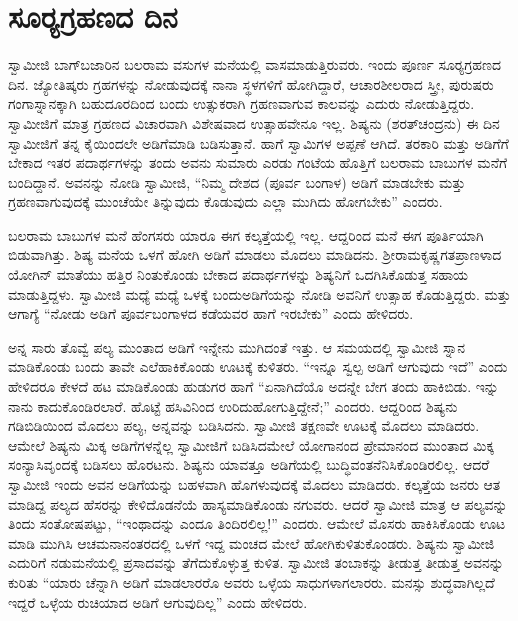 
\chapter{ಸೂರ‍್ಯಗ್ರಹಣದ ದಿನ}

ಸ್ವಾಮೀಜಿ ಬಾಗ್‍ಬಜಾರಿನ ಬಲರಾಮ ವಸುಗಳ ಮನೆಯಲ್ಲಿ ವಾಸಮಾಡುತ್ತಿರುವರು. ಇಂದು ಪೂರ್ಣ ಸೂರ‍್ಯಗ್ರಹಣದ ದಿನ. ಜ್ಯೋತಿಷ್ಕರು ಗ್ರಹಗಳನ್ನು ನೋಡುವುದಕ್ಕೆ ನಾನಾ ಸ್ಥಳಗಳಿಗೆ ಹೋಗಿದ್ದಾರೆ, ಆಚಾರಶೀಲರಾದ ಸ್ತ್ರೀ, ಪುರುಷರು ಗಂಗಾಸ್ನಾನಕ್ಕಾಗಿ ಬಹುದೂರದಿಂದ ಬಂದು ಉತ್ಸುಕರಾಗಿ ಗ್ರಹಣವಾಗುವ ಕಾಲವನ್ನು ಎದುರು ನೋಡುತ್ತಿದ್ದರು. ಸ್ವಾಮೀಜಿಗೆ ಮಾತ್ರ ಗ್ರಹಣದ ವಿಚಾರವಾಗಿ ವಿಶೇಷವಾದ ಉತ್ಸಾಹವೇನೂ ಇಲ್ಲ. ಶಿಷ್ಯನು (ಶರತ್‍ಚಂದ್ರನು) ಈ ದಿನ ಸ್ವಾಮೀಜಿಗೆ ತನ್ನ ಕೈಯಿಂದಲೇ ಅಡಿಗೆಮಾಡಿ ಬಡಿಸುತ್ತಾನೆ. ಹಾಗೆ ಸ್ವಾಮಿಗಳ ಅಪ್ಪಣೆ ಆಗಿದೆ. ತರಕಾರಿ ಮತ್ತು ಅಡಿಗೆಗೆ ಬೇಕಾದ ಇತರ ಪದಾರ್ಥಗಳನ್ನು ತಂದು ಅವನು ಸುಮಾರು ಎರಡು ಗಂಟೆಯ ಹೊತ್ತಿಗೆ ಬಲರಾಮ ಬಾಬುಗಳ ಮನೆಗೆ ಬಂದಿದ್ದಾನೆ. ಅವನನ್ನು ನೋಡಿ ಸ್ವಾಮೀಜಿ, “ನಿಮ್ಮ ದೇಶದ (ಪೂರ್ವ ಬಂಗಾಳ) ಅಡಿಗೆ ಮಾಡಬೇಕು ಮತ್ತು ಗ್ರಹಣವಾಗುವುದಕ್ಕೆ ಮುಂಚೆಯೇ ತಿನ್ನುವುದು ಕೊಡುವುದು ಎಲ್ಲಾ ಮುಗಿದು ಹೋಗಬೇಕು” ಎಂದರು. 

 ಬಲರಾಮ ಬಾಬುಗಳ ಮನೆ ಹೆಂಗಸರು ಯಾರೂ ಈಗ ಕಲ್ಕತ್ತೆಯಲ್ಲಿ ಇಲ್ಲ. ಆದ್ದರಿಂದ ಮನೆ ಈಗ ಪೂರ್ತಿಯಾಗಿ ಬಿಡುವಾಗಿತ್ತು. ಶಿಷ್ಯ ಮನೆಯ ಒಳಗೆ ಹೋಗಿ ಅಡಿಗೆ ಮಾಡಲು ಮೊದಲು ಮಾಡಿದನು. ಶ‍್ರೀರಾಮಕೃಷ್ಣಗತಪ್ರಾಣಳಾದ ಯೋಗಿನ್ ಮಾತೆಯು ಹತ್ತಿರ ನಿಂತುಕೊಂಡು ಬೇಕಾದ ಪದಾರ್ಥಗಳನ್ನು ಶಿಷ್ಯನಿಗೆ ಒದಗಿಸಿಕೊಡುತ್ತ ಸಹಾಯ ಮಾಡುತ್ತಿದ್ದಳು. ಸ್ವಾಮೀಜಿ ಮಧ್ಯೆ ಮಧ್ಯೆ ಒಳಕ್ಕೆ ಬಂದು\break ಅಡಿಗೆಯನ್ನು ನೋಡಿ ಅವನಿಗೆ ಉತ್ಸಾಹ ಕೊಡುತ್ತಿದ್ದರು. ಮತ್ತು ಆಗಾಗ್ಯೆ “ನೋಡು ಅಡಿಗೆ ಪೂರ್ವಬಂಗಾಳದ ಕಡೆಯವರ ಹಾಗೆ ಇರಬೇಕು” ಎಂದು ಹೇಳಿದರು. 

 ಅನ್ನ ಸಾರು ತೊವ್ವೆ ಪಲ್ಯ ಮುಂತಾದ ಅಡಿಗೆ ಇನ್ನೇನು ಮುಗಿದಂತೆ ಇತ್ತು. ಆ ಸಮಯದಲ್ಲಿ ಸ್ವಾಮೀಜಿ ಸ್ನಾನ ಮಾಡಿಕೊಂಡು ಬಂದು ತಾವೇ ಎಲೆಹಾಕಿಕೊಂಡು ಊಟಕ್ಕೆ ಕುಳಿತರು. “ಇನ್ನೂ ಸ್ವಲ್ಪ ಅಡಿಗೆ ಆಗುವುದು ಇದೆ” ಎಂದು ಹೇಳಿದರೂ ಕೇಳದೆ ಹಟ ಮಾಡಿಕೊಂಡು ಹುಡುಗರ ಹಾಗೆ “ಏನಾಗಿದೆಯೊ ಅದನ್ನೇ ಬೇಗ ತಂದು ಹಾಕಿಬಿಡು. ಇನ್ನು ನಾನು ಕಾದುಕೊಂಡಿರಲಾರೆ. ಹೊಟ್ಟೆ ಹಸಿವಿನಿಂದ ಉರಿದುಹೋಗುತ್ತಿದ್ದೇನೆ;” ಎಂದರು. ಆದ್ದರಿಂದ ಶಿಷ್ಯನು ಗಡಿಬಿಡಿಯಿಂದ ಮೊದಲು ಪಲ್ಯ, ಅನ್ನವನ್ನು ಬಡಿಸಿದನು. ಸ್ವಾಮೀಜಿ ತಕ್ಷಣವೇ ಊಟಕ್ಕೆ ಮೊದಲು ಮಾಡಿದರು. ಆಮೇಲೆ ಶಿಷ್ಯನು ಮಿಕ್ಕ ಅಡಿಗೆಗಳನ್ನೆಲ್ಲ ಸ್ವಾಮೀಜಿಗೆ ಬಡಿಸಿದಮೇಲೆ ಯೋಗಾನಂದ ಪ್ರೇಮಾನಂದ ಮುಂತಾದ ಮಿಕ್ಕ ಸಂನ್ಯಾಸಿವೃಂದಕ್ಕೆ ಬಡಿಸಲು ಹೊರಟನು. ಶಿಷ್ಯನು ಯಾವತ್ತೂ ಅಡಿಗೆಯಲ್ಲಿ ಬುದ್ಧಿವಂತನೆನಿಸಿಕೊಂಡಿರಲಿಲ್ಲ. ಆದರೆ ಸ್ವಾಮೀಜಿ ಇಂದು ಅವನ ಅಡಿಗೆಯನ್ನು ಬಹಳವಾಗಿ ಹೊಗಳುವುದಕ್ಕೆ ಮೊದಲು ಮಾಡಿದರು. ಕಲ್ಕತ್ತೆಯ ಜನರು ಆತ ಮಾಡಿದ್ದ ಪಲ್ಯದ ಹೆಸರನ್ನು ಕೇಳಿದೊಡನೆಯೆ ಹಾಸ್ಯಮಾಡಿಕೊಂಡು ನಗುವರು. ಆದರೆ ಸ್ವಾಮೀಜಿ ಮಾತ್ರ ಆ ಪಲ್ಯವನ್ನು ತಿಂದು ಸಂತೋಷಪಟ್ಟು, “ಇಂಥಾದನ್ನು ಎಂದೂ ತಿಂದಿರಲಿಲ್ಲ!” ಎಂದರು. ಆಮೇಲೆ ಮೊಸರು ಹಾಕಿಸಿಕೊಂಡು ಊಟ ಮಾಡಿ ಮುಗಿಸಿ ಆಚಮನಾನಂತರದಲ್ಲಿ ಒಳಗೆ ಇದ್ದ ಮಂಚದ ಮೇಲೆ ಹೋಗಿ\break ಕುಳಿತುಕೊಂಡರು. ಶಿಷ್ಯನು ಸ್ವಾಮೀಜಿ ಎದುರಿಗೆ ನಡುಮನೆಯಲ್ಲಿ ಪ್ರಸಾದವನ್ನು ತೆಗೆದುಕೊಳ್ಳುತ್ತ ಕುಳಿತ. ಸ್ವಾಮೀಜಿ ತಂಬಾಕನ್ನು ತೀಡುತ್ತ ತೀಡುತ್ತ ಅವನನ್ನು ಕುರಿತು “ಯಾರು ಚೆನ್ನಾಗಿ ಅಡಿಗೆ ಮಾಡಲಾರರೊ ಅವರು ಒಳ್ಳೆಯ ಸಾಧುಗಳಾಗಲಾರರು. ಮನಸ್ಸು ಶುದ್ಧವಾಗಿಲ್ಲದೆ ಇದ್ದರೆ ಒಳ್ಳೆಯ ರುಚಿಯಾದ ಅಡಿಗೆ ಆಗುವುದಿಲ್ಲ” ಎಂದು ಹೇಳಿದರು. 

